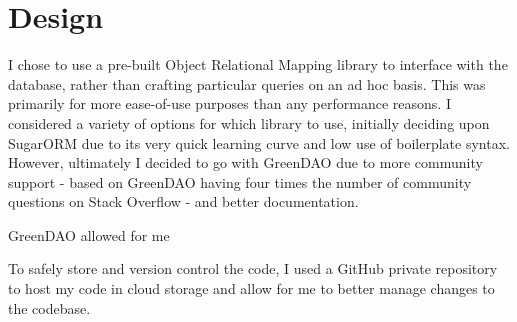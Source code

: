 \chapter{Design}

I chose to use a pre-built Object Relational Mapping library to interface with the database, rather than crafting particular queries on an ad hoc basis.
This was primarily for more ease-of-use purposes than any performance reasons. 
I considered a variety of options for which library to use, initially deciding upon SugarORM due to its very quick learning curve and low use of boilerplate syntax. 
However, ultimately I decided to go with GreenDAO \citep{greendao} due to more community support - based on GreenDAO having four times the number of community questions on Stack Overflow - and better documentation.

GreenDAO allowed for me 

To safely store and version control the code, I used a GitHub private repository to host my code in cloud storage and allow for me to better manage changes to the codebase.